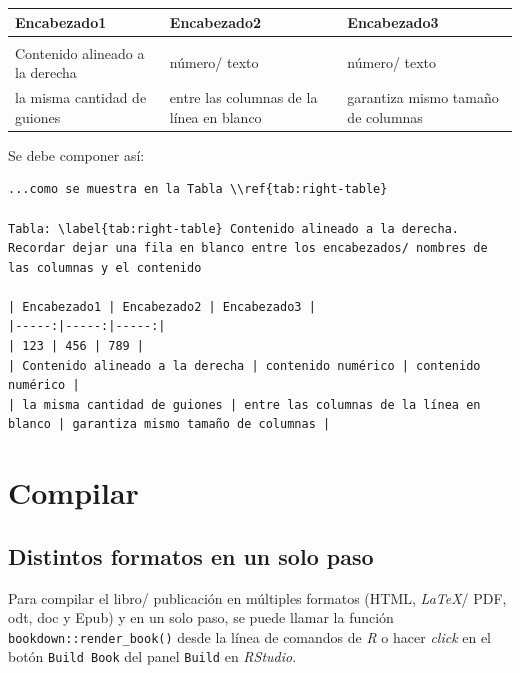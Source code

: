 \documentclass[
]{book}
\begin{document}
\begin{longtable}[]{@{}
  >{\raggedleft\arraybackslash}p{}
  >{\raggedleft\arraybackslash}p{}
  >{\raggedleft\arraybackslash}p{}@{}}
\toprule
Encabezado1 & Encabezado2 & Encabezado3 \\
\midrule
\endhead
123 & 456 & 789 \\
Contenido alineado a la derecha & número/ texto & número/ texto \\
la misma cantidad de guiones & entre las columnas de la línea en blanco & garantiza mismo tamaño de columnas \\
\bottomrule
\end{longtable}

Se debe componer así:

\begin{verbatim}
...como se muestra en la Tabla \\ref{tab:right-table}

Tabla: \label{tab:right-table} Contenido alineado a la derecha. Recordar dejar una fila en blanco entre los encabezados/ nombres de las columnas y el contenido

| Encabezado1 | Encabezado2 | Encabezado3 |
|-----:|-----:|-----:|
| 123 | 456 | 789 |
| Contenido alineado a la derecha | contenido numérico | contenido numérico |
| la misma cantidad de guiones | entre las columnas de la línea en blanco | garantiza mismo tamaño de columnas |
\end{verbatim}

\hypertarget{compilar}{%
\chapter{Compilar}\label{compilar}}

\hypertarget{distintos-formatos-en-un-solo-paso}{%
\section{Distintos formatos en un solo paso}\label{distintos-formatos-en-un-solo-paso}}

Para compilar el libro/ publicación en múltiples formatos (HTML, \emph{LaTeX}/ PDF, odt, doc y Epub) y en un solo paso, se puede llamar la función \texttt{bookdown::render\_book()} desde la línea de comandos de \emph{R} o hacer \emph{click} en el botón \texttt{Build\ Book} del panel \texttt{Build} en \emph{RStudio}.
\end{document}

